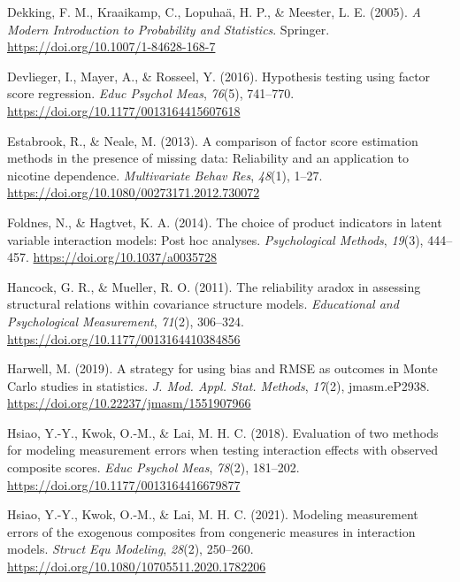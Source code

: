 \documentclass[
  man]{apa6}
\newlength{\cslhangindent}
\newenvironment{CSLReferences}[2] %
 {\begin{list}{}{%
  \setlength{\itemindent}{0pt}
  \setlength{\leftmargin}{0pt}
  \setlength{\parsep}{0pt}
  \ifodd #1
   \setlength{\leftmargin}{\cslhangindent}
   \setlength{\itemindent}{-1\cslhangindent}
  \fi
  \setlength{\itemsep}{#2\baselineskip}}}
 {\end{list}}
\begin{document}
\begin{CSLReferences}{1}{0}
Dekking, F. M., Kraaikamp, C., Lopuhaä, H. P., \& Meester, L. E. (2005). \emph{A {Modern Introduction} to {Probability} and {Statistics}}. Springer. \url{https://doi.org/10.1007/1-84628-168-7}

Devlieger, I., Mayer, A., \& Rosseel, Y. (2016). Hypothesis testing using factor score regression. \emph{Educ Psychol Meas}, \emph{76}(5), 741--770. \url{https://doi.org/10.1177/0013164415607618}

Estabrook, R., \& Neale, M. (2013). A comparison of factor score estimation methods in the presence of missing data: {Reliability} and an application to nicotine dependence. \emph{Multivariate Behav Res}, \emph{48}(1), 1--27. \url{https://doi.org/10.1080/00273171.2012.730072}

Foldnes, N., \& Hagtvet, K. A. (2014). The choice of product indicators in latent variable interaction models: {Post} hoc analyses. \emph{Psychological Methods}, \emph{19}(3), 444--457. \url{https://doi.org/10.1037/a0035728}

Hancock, G. R., \& Mueller, R. O. (2011). The reliability aradox in assessing structural relations within covariance structure models. \emph{Educational and Psychological Measurement}, \emph{71}(2), 306--324. \url{https://doi.org/10.1177/0013164410384856}

Harwell, M. (2019). A strategy for using bias and {RMSE} as outcomes in {Monte Carlo} studies in statistics. \emph{J. Mod. Appl. Stat. Methods}, \emph{17}(2), jmasm.eP2938. \url{https://doi.org/10.22237/jmasm/1551907966}

Hsiao, Y.-Y., Kwok, O.-M., \& Lai, M. H. C. (2018). Evaluation of two methods for modeling measurement errors when testing interaction effects with observed composite scores. \emph{Educ Psychol Meas}, \emph{78}(2), 181--202. \url{https://doi.org/10.1177/0013164416679877}

Hsiao, Y.-Y., Kwok, O.-M., \& Lai, M. H. C. (2021). Modeling measurement errors of the exogenous composites from congeneric measures in interaction models. \emph{Struct Equ Modeling}, \emph{28}(2), 250--260. \url{https://doi.org/10.1080/10705511.2020.1782206}


\end{CSLReferences}
\end{document}
